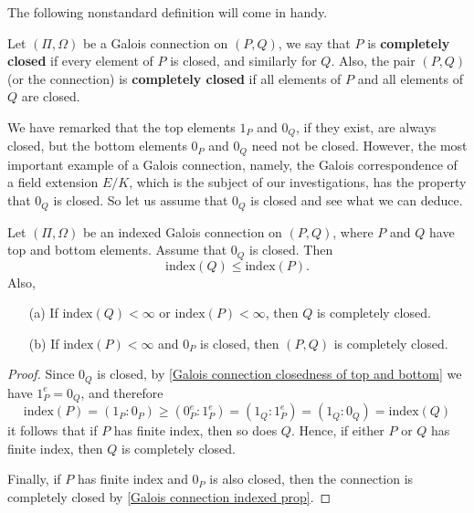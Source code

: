 The following nonstandard definition will come in handy.
\begin{definition}
Let $(\Pi,\Omega)$ be a Galois connection on $(P,Q)$, we say that $P$ is \textbf{completely closed} if every element of $P$ is closed, and similarly for $Q$. Also, the pair $(P,Q)$ (or the connection) is \textbf{completely closed} if all elements of $P$ and all elements of $Q$ are closed.
\end{definition}
We have remarked that the top elements $1_P$ and $0_Q$, if they exist, are always closed, but the bottom elements $0_P$ and $0_Q$ need not be closed. However, the most important example of a Galois connection, namely, the
Galois correspondence of a field extension $E/K$, which is the subject of our investigations, has the property that $0_Q$ is closed. So let us assume that $0_Q$ is closed and see what we can deduce.\par
\begin{theorem}\label{Galois connection 0_Q is closed}
Let $(\Pi,\Omega)$ be an indexed Galois connection on $(P,Q)$, where $P$ and $Q$ have top and bottom elements. Assume that $0_Q$ is closed. Then 
\[\mathrm{index}(Q)\leq\mathrm{index}(P).\]
Also,
\begin{itemize}
\item[(a)] If $\mathrm{index}(Q)<\infty$ or $\mathrm{index}(P)<\infty$, then $Q$ is completely closed.
\item[(b)] If $\mathrm{index}(P)<\infty$ and $0_P$ is closed, then $(P,Q)$ is completely closed.
\end{itemize}
\end{theorem}
\begin{proof}
Since $0_Q$ is closed, by \cref{Galois connection closedness of top and bottom} we have $1_P^e=0_Q$, and therefore
\[\mathrm{index}(P)=(1_P:0_P)\geq(0_P^e:1_P^e)=(1_Q:1_P^e)=(1_Q:0_Q)=\mathrm{index}(Q)\]
it follows that if $P$ has finite index, then so does $Q$. Hence, if either $P$ or $Q$ has finite index, then $Q$ is completely closed.\par
Finally, if $P$ has finite index and $0_P$ is also closed, then the connection is completely closed by \cref{Galois connection indexed prop}.
\end{proof}
